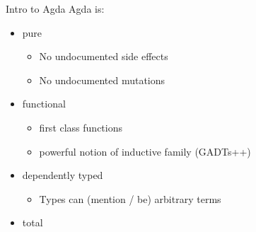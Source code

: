 \documentclass{beamer}
\begin{document}
\begin{frame}{Intro to Agda}
Agda is:
\begin{itemize}
  \item pure
    \begin{itemize}
      \item No undocumented side effects
      \item No undocumented mutations
    \end{itemize}
  \item functional
    \begin{itemize}
      \item first class functions
      \item powerful notion of inductive family (GADTs++)
    \end{itemize}
  \item dependently typed
    \begin{itemize}
      \item Types can (mention / be) arbitrary terms
    \end{itemize}
  \item<1> total
\end{itemize}

\end{frame}
\end{document}
